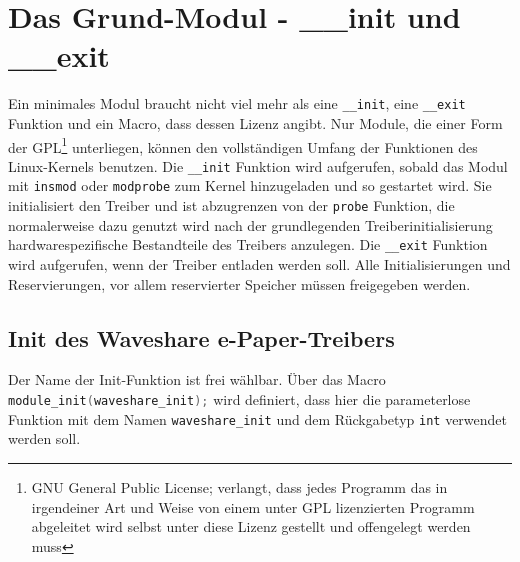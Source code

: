 
\section{Das Grund-Modul - {\_\_}init und {\_\_}exit}
Ein minimales Modul braucht nicht viel mehr als eine \texttt{__init}, eine \texttt{__exit} Funktion und ein Macro, dass dessen Lizenz angibt. Nur Module, die einer Form der GPL\footnote{GNU General Public License; verlangt, dass jedes Programm das in irgendeiner Art und Weise von einem unter GPL lizenzierten Programm abgeleitet wird selbst unter diese Lizenz gestellt und offengelegt werden muss} unterliegen, können den vollständigen Umfang der Funktionen des Linux-Kernels benutzen. %
Die \texttt{__init} Funktion wird aufgerufen, sobald das Modul mit \texttt{insmod} oder \texttt{modprobe} zum Kernel hinzugeladen und so gestartet wird. Sie initialisiert den Treiber und ist abzugrenzen von der \texttt{probe} Funktion, die normalerweise dazu genutzt wird nach der grundlegenden Treiberinitialisierung hardwarespezifische Bestandteile des Treibers anzulegen. 
Die \texttt{__exit} Funktion wird aufgerufen, wenn der Treiber entladen werden soll. Alle Initialisierungen und Reservierungen, vor allem reservierter Speicher müssen freigegeben werden. 

\subsection{Init des Waveshare e-Paper-Treibers}
Der Name der Init-Funktion ist frei wählbar. Über das Macro \mintinline {c}{module_init(waveshare_init);} wird  definiert, dass hier die parameterlose Funktion mit dem Namen \texttt{waveshare\_init} und dem Rückgabetyp \texttt{int} verwendet werden soll. 

